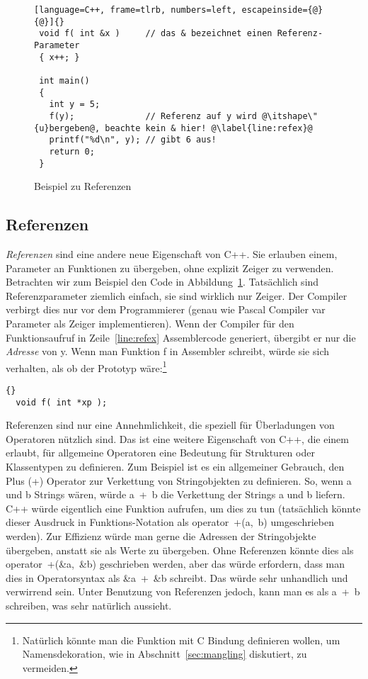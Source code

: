 \begin{figure}
\begin{lstlisting}[language=C++, frame=tlrb, numbers=left, escapeinside={@}{@}]{}
 void f( int &x )     // das & bezeichnet einen Referenz-Parameter
 { x++; }

 int main()
 {
   int y = 5;
   f(y);              // Referenz auf y wird @\itshape\"{u}bergeben@, beachte kein & hier! @\label{line:refex}@
   printf("%d\n", y); // gibt 6 aus!
   return 0;
 }
\end{lstlisting}
\caption{Beispiel zu Referenzen \label{fig:refex}}
\end{figure}

\subsection{Referenzen}

\emph{Referenzen} sind eine andere neue Eigenschaft von C++. Sie
erlauben einem, Parameter an Funktionen zu \"{u}bergeben, ohne explizit
Zeiger zu verwenden. Betrachten wir zum Beispiel den Code in
Abbildung~\ref{fig:refex}. Tat\-s\"{a}ch\-lich sind Referenzparameter
ziemlich einfach, sie sind wirklich nur Zeiger. Der Compiler
verbirgt dies nur vor dem Programmierer (genau wie Pascal Compiler
{\code var} Parameter als Zeiger implementieren). Wenn der Compiler
f\"{u}r den Funktionsaufruf in Zeile~\ref{line:refex} Assemblercode
generiert, \"{u}bergibt er nur die \emph{Adresse} von {\code y}. Wenn
man Funktion {\code f} in Assembler schreibt, w\"{u}rde sie sich
verhalten, als ob der Prototyp w\"{a}re:\footnote{Nat\"{u}rlich k\"{o}nnte man
die Funktion mit C Bindung definieren wollen, um Namensdekoration,
wie in Abschnitt~\ref{sec:mangling} diskutiert, zu vermeiden.}
\begin{lstlisting}[stepnumber=0]{}
  void f( int *xp );
\end{lstlisting}

Referenzen sind nur eine Annehmlichkeit, die speziell f\"{u}r
\"{U}berladungen von Operatoren n\"{u}tzlich sind. Das ist eine weitere
Eigenschaft von C++, die einem erlaubt, f\"{u}r allgemeine Operatoren
eine Bedeutung f\"{u}r Strukturen oder Klassentypen zu definieren. Zum
Beispiel ist es ein allgemeiner Gebrauch, den Plus ({\code +})
Operator zur Verkettung von Stringobjekten zu definieren. So, wenn
{\code a} und {\code b} Strings w\"{a}ren, w\"{u}rde {\code a~+~b} die
Verkettung der Strings {\code a} und {\code b} liefern. C++ w\"{u}rde
eigentlich eine Funktion aufrufen, um dies zu tun (tats\"{a}chlich
k\"{o}nnte dieser Ausdruck in Funktions-Notation als {\code
operator~+(a,~b)} umgeschrieben werden). Zur Effizienz w\"{u}rde man
gerne die Adressen der Stringobjekte \"{u}bergeben, anstatt sie als
Werte zu \"{u}bergeben. Ohne Referenzen k\"{o}nnte dies als {\code
operator~+(\&a,~\&b)} geschrieben werden, aber das w\"{u}rde erfordern,
dass man dies in Operatorsyntax als {\code \&a~+~\&b} schreibt. Das
w\"{u}rde sehr unhandlich und verwirrend sein. Unter Benutzung von
Referenzen jedoch, kann man es als {\code a~+~b} schreiben, was sehr
nat\"{u}rlich aussieht. 

